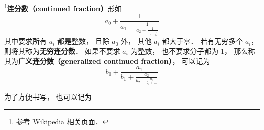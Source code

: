 
\footnote{参考 Wikipedia \href{https://en.wikipedia.org/wiki/Continued_fraction}{相关页面}．}\textbf{连分数（continued fraction）}形如
\begin{equation}
a_0 + \frac{1}{\displaystyle a_1 + \frac{1}{\displaystyle a_2 + \frac{1}{\displaystyle \ddots + \frac{1}{a_n}}}}
\end{equation}
其中要求所有 $a_i$ 都是整数， 且除 $a_0$ 外， 其他 $a_i$ 都大于零． 若有无穷多个 $a_i$， 则将其称为\textbf{无穷连分数}． 如果不要求 $a_i$ 为整数， 也不要求分子都为 1， 那么称其为\textbf{广义连分数（generalized continued fraction）}， 可以记为
\begin{equation}
b_0 + \frac{a_1}{\displaystyle b_1 + \frac{a_2}{\displaystyle b_2 + \frac{a_3}{\displaystyle b_3 + \dots}}}
\end{equation}

为了方便书写， 也可以记为
